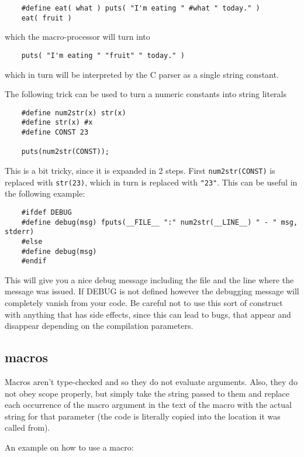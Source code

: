 \begin{verbatim}
	#define eat( what ) puts( "I'm eating " #what " today." )
	eat( fruit )
\end{verbatim}

which the macro-processor will turn into

\begin{verbatim}
	puts( "I'm eating " "fruit" " today." )
\end{verbatim}

which in turn will be interpreted by the C parser as a single string constant.

The following trick can be used to turn a numeric constants into string literals

\begin{verbatim}
	#define num2str(x) str(x)
	#define str(x) #x
	#define CONST 23
	
	puts(num2str(CONST));
\end{verbatim}

This is a bit tricky, since it is expanded in 2 steps. First \texttt{num2str(CONST)} is replaced with \texttt{str(23)}, which in turn is replaced with \texttt{"23"}. This can be useful in the following example:

\begin{verbatim}
	#ifdef DEBUG
	#define debug(msg) fputs(__FILE__ ":" num2str(__LINE__) " - " msg, stderr)
	#else
	#define debug(msg)
	#endif
\end{verbatim}

This will give you a nice debug message including the file and the line where the message was issued. If DEBUG is not defined however the debugging message will completely vanish from your code. Be careful not to use this sort of construct with anything that has side effects, since this can lead to bugs, that appear and disappear depending on the compilation parameters.

\subsection{macros}

Macros aren't type-checked and so they do not evaluate arguments. Also, they do not obey scope properly, but simply take the string passed to them and replace each occurrence of the macro argument in the text of the macro with the actual string for that parameter (the code is literally copied into the location it was called from).

An example on how to use a macro:

